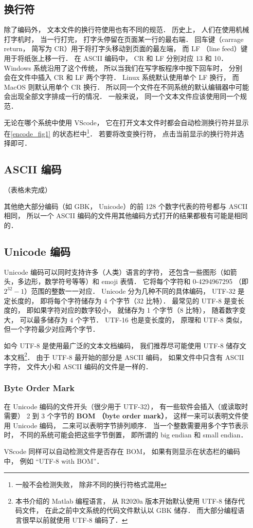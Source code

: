 \subsection{换行符}
除了编码外， 文本文件的换行符使用也有不同的规范． 历史上， 人们在使用机械打字机时， 当一行打完， 打字头停留在页面某一行的最右端． 回车键（carrage return， 简写为 CR）用于将打字头移动到页面的最左端， 而 LF （line feed）键用于将纸张上移一行． 在 ASCII 编码中， CR 和 LF 分别对应 13 和 10． Windows 系统沿用了这个传统， 所以当我们在写字板程序中按下回车时， 分别会在文件中插入 CR 和 LF 两个字符． Linux 系统默认使用单个 LF 换行， 而 MacOS 则默认用单个 CR 换行． 所以同一个文件在不同系统的默认编辑器中可能会出现全部文字排成一行的情况． 一般来说， 同一个文本文件应该使用同一个规范．

无论在哪个系统中使用 VScode， 它在打开文本文件时都会自动检测换行符并显示在\autoref{encode_fig1} 的状态栏中\footnote{一般不会检测失败， 除非不同的换行符格式混用}． 若要将改变换行符， 点击当前显示的换行符并选择即可．

\subsection{ASCII 编码}
（表格未完成）

其他绝大部分编码（如 GBK， Unicode）的前 128 个数字代表的符号都与 ASCII 相同， 所以一个 ASCII 编码的文件用其他编码方式打开的结果都极有可能是相同的．

\subsection{Unicode 编码}
Unicode 编码可以同时支持许多（人类）语言的字符， 还包含一些图形（如箭头，多边形，数学符号等等）和 emoji 表情． 它将每个字符和 0-4294967295 （即 $2^{32}-1$）范围的整数一一对应． Unicode 分为几种不同的具体编码， UTF-32 是定长度的， 即将每个字符储存为 4 个字节（32 比特）． 最常见的 UTF-8 是变长度的， 即如果字符对应的数字较小， 就储存为 1 个字节（8 比特）， 随着数字变大， 可以最多储存为 4 个字节． UTF-16 也是变长度的， 原理和 UTF-8 类似， 但一个字符最少对应两个字节．

如今 UTF-8 是使用最广泛的文本文档编码， 我们推荐尽可能使用 UTF-8 储存文本文档\footnote{本书介绍的 Matlab 编程语言， 从 R2020a 版本开始默认使用 UTF-8 储存代码文件， 在此之前中文系统的代码文件默认以 GBK 储存． 而大部分编程语言很早以前就使用 UTF-8 编码了．}． 由于 UTF-8 最开始的部分是 ASCII 编码， 如果文件中只含有 ASCII 字符， 文件大小和 ASCII 编码的文件是一样的．

\subsubsection{Byte Order Mark}
在 Unicode 编码的文件开头（很少用于 UTF-32）， 有一些软件会插入（或读取时需要） 2 到 3 个字节的 \textbf{BOM （byte order mark）}， 这样一来可以表明文件使用 Unicode 编码， 二来可以表明字节排列顺序． 当一个整数需要用多个字节表示时， 不同的系统可能会把这些字节倒置， 即所谓的 big endian 和 small endian．

VScode 同样可以自动检测文件是否存在 BOM， 如果有则显示在状态栏的编码中， 例如 “UTF-8 with BOM”．
